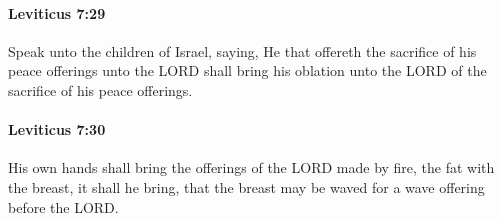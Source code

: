 		\paragraph{Leviticus 7:29} %
			\label{LEVITICUS-7-29}

			Speak unto the children of Israel, saying, He that offereth the sacrifice of his peace offerings unto the LORD shall bring his oblation unto the LORD of the sacrifice of his peace offerings.


		\paragraph{Leviticus 7:30} %
			\label{LEVITICUS-7-30}

			His own hands shall bring the offerings of the LORD made by fire, the fat with the breast, it shall he bring, that the breast may be waved for a wave offering before the LORD.


